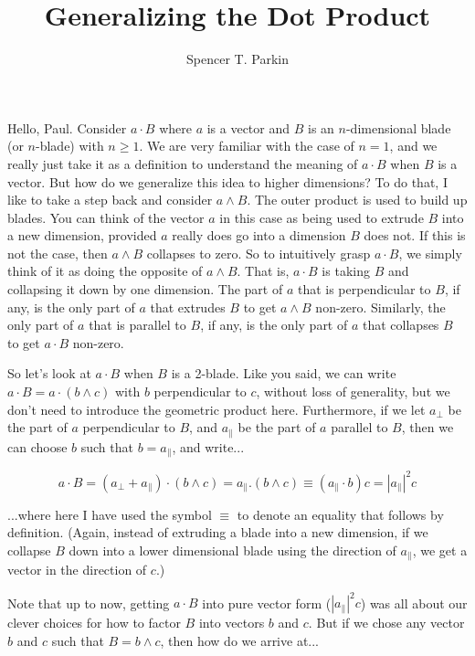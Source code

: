 \documentclass[12pt]{article}
\title{Generalizing the Dot Product}
\author{Spencer T. Parkin}
\begin{document}
\maketitle

Hello, Paul.  Consider $a\cdot B$ where $a$ is a vector and $B$ is an $n$-dimensional blade (or $n$-blade) with $n\geq 1$.  We are very familiar with the case of $n=1$, and we really just take it as a definition to understand the meaning of $a\cdot B$ when $B$ is a vector.  But how do we generalize this idea to higher dimensions?  To do that, I like to take a step back and consider $a\wedge B$.  The outer product is used to build up blades.  You can think of the vector $a$ in this case as being used to extrude $B$ into a new dimension, provided $a$ really does go into a dimension $B$ does not.  If this is not the case, then $a\wedge B$ collapses to zero.  So to intuitively grasp $a\cdot B$, we simply think of it as doing the opposite of $a\wedge B$.  That is, $a\cdot B$ is taking $B$ and collapsing it down by one dimension.  The part of $a$ that is perpendicular to $B$, if any, is the only part of $a$ that extrudes $B$ to get $a\wedge B$ non-zero.  Similarly, the only part of $a$ that is parallel to $B$, if any, is the only part of $a$ that collapses $B$ to get $a\cdot B$ non-zero.

So let's look at $a\cdot B$ when $B$ is a 2-blade.  Like you said, we can write $a\cdot B = a\cdot (b\wedge c)$ with $b$ perpendicular to $c$, without loss of generality, but we don't need to introduce the geometric product here.  Furthermore, if we let $a_{\bot}$ be the part of $a$ perpendicular to $B$, and $a_{\parallel}$ be the part of $a$ parallel to $B$, then we can choose $b$ such that $b=a_{\parallel}$, and write...

\begin{equation*}
  a\cdot B = (a_{\bot} + a_{\parallel})\cdot (b\wedge c) = a_{\parallel}.(b\wedge c) \equiv (a_{\parallel}\cdot b)c = |a_{\parallel}|^2 c
\end{equation*}
  
...where here I have used the symbol $\equiv$ to denote an equality that follows by definition.  (Again, instead of extruding a blade into a new dimension, if we collapse $B$ down into a lower dimensional blade using the direction of $a_{\parallel}$, we get a vector in the direction of $c$.)

Note that up to now, getting $a\cdot B$ into pure vector form ($|a_{\parallel}|^2 c$) was all about our clever choices for how to factor $B$ into vectors $b$ and $c$.  But if we chose any vector $b$ and $c$ such that $B=b\wedge c$, then how do we arrive at...
\end{document}

